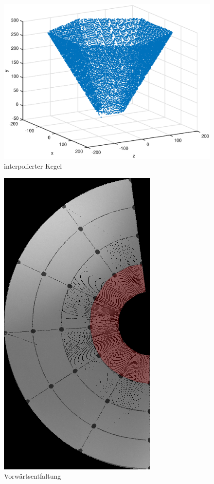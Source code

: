 \begin{figure}[!htb]
	\centering
	\includegraphics[scale=.7]{images/3d_interpol.eps}
	\caption{interpolierter Kegel}
	\label{fig:3DInterpol}
\end{figure}

\begin{figure}[!htb]
	\centering
	\includegraphics[angle=-90, width=.7\textwidth]{images/coneRaspUnWarpForwardHigh.png}
	\caption{Vorwärtsentfaltung}
	\label{fig:forwardHoles}
\end{figure}

